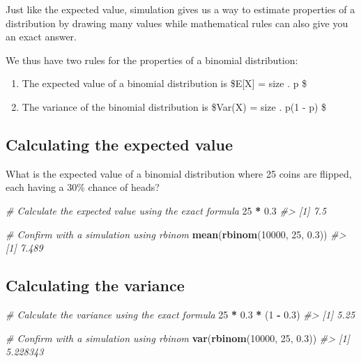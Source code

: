 \documentclass[]{article}
\newenvironment{Shaded}{\begin{snugshade}}{\end{snugshade}}
\newcommand{\CommentTok}[1]{\textcolor[rgb]{0.56,0.35,0.01}{\textit{#1}}}
\newcommand{\DecValTok}[1]{\textcolor[rgb]{0.00,0.00,0.81}{#1}}
\newcommand{\FloatTok}[1]{\textcolor[rgb]{0.00,0.00,0.81}{#1}}
\newcommand{\KeywordTok}[1]{\textcolor[rgb]{0.13,0.29,0.53}{\textbf{#1}}}
\newcommand{\NormalTok}[1]{#1}
\newcommand{\OperatorTok}[1]{\textcolor[rgb]{0.81,0.36,0.00}{\textbf{#1}}}
\newcommand{\StringTok}[1]{\textcolor[rgb]{0.31,0.60,0.02}{#1}}
\providecommand{\tightlist}{%
  \setlength{\itemsep}{0pt}\setlength{\parskip}{0pt}}
\begin{document}
Just like the expected value, simulation gives us a way to estimate
properties of a distribution by drawing many values while mathematical
rules can also give you an exact answer.

We thus have two rules for the properties of a binomial distribution:

\begin{enumerate}
\def\labelenumi{\arabic{enumi}.}
\tightlist
\item
  The expected value of a binomial distribution is
  \$\textrm{E[X] = size . p} \$
\item
  The variance of the binomial distribution is
  \$\textrm{Var(X) = size . p(1 - p)} \$
\end{enumerate}

\hypertarget{calculating-the-expected-value}{%
\subsection{Calculating the expected
value}\label{calculating-the-expected-value}}

What is the expected value of a binomial distribution where 25 coins are
flipped, each having a 30\% chance of heads?

\begin{Shaded}
\begin{Highlighting}[]
\CommentTok{# Calculate the expected value using the exact formula}
\DecValTok{25} \OperatorTok{*}\StringTok{ }\FloatTok{0.3}
\CommentTok{#> [1] 7.5}

\CommentTok{# Confirm with a simulation using rbinom}
\KeywordTok{mean}\NormalTok{(}\KeywordTok{rbinom}\NormalTok{(}\DecValTok{10000}\NormalTok{, }\DecValTok{25}\NormalTok{, }\FloatTok{0.3}\NormalTok{))}
\CommentTok{#> [1] 7.489}
\end{Highlighting}
\end{Shaded}

\hypertarget{calculating-the-variance}{%
\subsection{Calculating the variance}\label{calculating-the-variance}}

\begin{Shaded}
\begin{Highlighting}[]
\CommentTok{# Calculate the variance using the exact formula}
\DecValTok{25} \OperatorTok{*}\StringTok{ }\FloatTok{0.3} \OperatorTok{*}\StringTok{ }\NormalTok{(}\DecValTok{1} \OperatorTok{-}\StringTok{ }\FloatTok{0.3}\NormalTok{)}
\CommentTok{#> [1] 5.25}

\CommentTok{# Confirm with a simulation using rbinom}
\KeywordTok{var}\NormalTok{(}\KeywordTok{rbinom}\NormalTok{(}\DecValTok{10000}\NormalTok{, }\DecValTok{25}\NormalTok{, }\FloatTok{0.3}\NormalTok{))}
\CommentTok{#> [1] 5.228343}
\end{Highlighting}
\end{Shaded}
\end{document}
